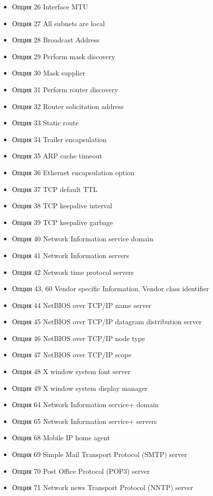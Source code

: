 \documentclass[14pt,a4paper]{extarticle}
\begin{document}
\begin{itemize}
    \item Опция 26 Interface MTU
    \item Опция 27 All subnets are local
    \item Опция 28 Broadcast Address
    \item Опция 29 Perform mask discovery
    \item Опция 30 Mask supplier
    \item Опция 31 Perform router discovery
    \item Опция 32 Router solicitation address
    \item Опция 33 Static route
    \item Опция 34 Trailer encapsulation
    \item Опция 35 ARP cache timeout
    \item Опция 36 Ethernet encapsulation option
    \item Опция 37 TCP default TTL
    \item Опция 38 TCP keepalive interval
    \item Опция 39 TCP keepalive garbage
    \item Опция 40 Network Information service domain
    \item Опция 41 Network Information servers
    \item Опция 42 Network time protocol servers
    \item Опции 43, 60 Vendor specific Information, Vendor class identifier
    \item Опция 44 NetBIOS over TCP/IP name server
    \item Опция 45 NetBIOS over TCP/IP datagram distribution server
    \item Опция 46 NetBIOS over TCP/IP node type
    \item Опция 47 NetBIOS over TCP/IP scope
    \item Опция 48 X window system font server
    \item Опция 49 X window system display manager
    \item Опция 64 Network Information service+ domain
    \item Опция 65 Network Information service+ servers
    \item Опция 68 Mobile IP home agent
    \item Опция 69 Simple Mail Transport Protocol (SMTP) server
    \item Опция 70 Post Office Protocol (POP3) server
    \item Опция 71 Network news Transport Protocol (NNTP) server

\end{itemize}
\end{document}
